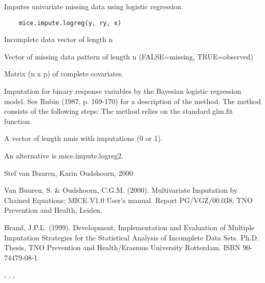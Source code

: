 \begin{Description}\relax
Imputes univariate missing data using logistic regression.
\end{Description}
\begin{Usage}
\begin{verbatim}
    mice.impute.logreg(y, ry, x)
\end{verbatim}
\end{Usage}
\begin{Arguments}
\begin{ldescription}
\item[\code{y}] Incomplete data vector of length n
\item[\code{ry}] Vector of missing data pattern of length n (FALSE=missing,
TRUE=observed) 
\item[\code{x}] Matrix (n x p) of complete covariates.
\end{ldescription}
\end{Arguments}
\begin{Details}\relax
Imputation for binary response variables by the Bayesian 
logistic regression model. See Rubin (1987, p. 169-170) for
a description of the method.
The method consists of the following steps:
The method relies on the standard glm.fit function.
\end{Details}
\begin{Value}
\begin{ldescription}
\item[\code{imp}] A vector of length nmis with imputations (0 or 1).
\end{ldescription}
\end{Value}
\begin{Note}\relax
An alternative is mice.impute.logreg2.
\end{Note}
\begin{Author}\relax
Stef van Buuren, Karin Oudshoorn, 2000
\end{Author}
\begin{References}\relax
Van Buuren, S. \& Oudshoorn, C.G.M. (2000). Multivariate Imputation by Chained Equations: 
MICE V1.0 User's manual. Report PG/VGZ/00.038, TNO Prevention and Health, Leiden.

Brand, J.P.L. (1999). Development, Implementation and Evaluation of Multiple Imputation Strategies for 
the Statistical Analysis of Incomplete Data Sets. Ph.D. Thesis, 
TNO Prevention and Health/Erasmus University Rotterdam. ISBN 90-74479-08-1.
\end{References}
\begin{SeeAlso}\relax
{}, , ,
\end{SeeAlso}

